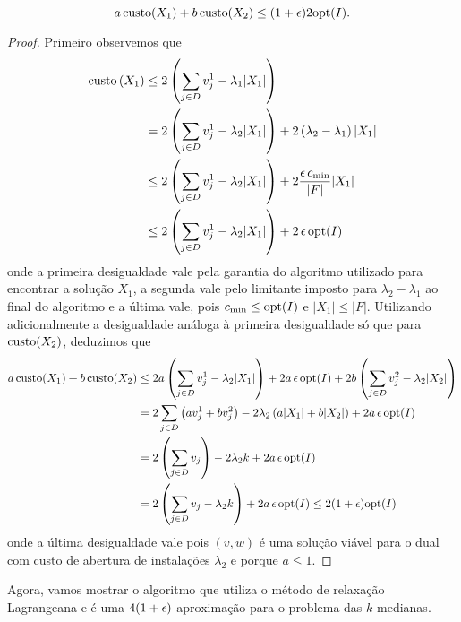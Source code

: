 \begin{lemma}
    \label{k-median_relLag_lema1}
    \[a \, \mathrm{custo}(X_1) + b \,\mathrm{custo}(X_2) \leq (1+\epsilon) 2\mathrm{opt}(I).\]
\end{lemma}
\begin{proof}
Primeiro observemos que 
\begin{subequations}
    \begin{align*}
        \mathrm{custo}\left(X_1\right) &\leq 2\left(\sum_{j \in D} v_j^1 - \lambda_1|X_1|\right) \\
        & = 2 \left(\sum_{j \in D} v_j^1 - \lambda_2 |X_1| \right) + 2 \left(\lambda_2 - \lambda_1\right) |X_1| \\
        &\leq 2 \left(\sum_{j \in D} v_j^1 - \lambda_2 |X_1| \right) + 2\frac{\epsilon\, c_{\min}}{|F|}|X_1|  \\
        &\leq 2 \left(\sum_{j \in D} v_j^1 - \lambda_2 |X_1| \right) + 2 \, \epsilon \, \mathrm{opt}(I)
    \end{align*}
\end{subequations}
onde a primeira desigualdade vale pela garantia do algoritmo utilizado para encontrar a solução $X_1$, a segunda vale pelo limitante imposto para $\lambda_2 - \lambda_1$ ao final do algoritmo e a última vale, pois $c_{\min} \leq \mathrm{opt}(I)$ e $|X_1| \leq |F|$. Utilizando adicionalmente a desigualdade análoga à primeira desigualdade só que para $\mathrm{custo}(X_2)$, deduzimos que
\begin{subequations}
    \begin{align*}
        a \, \mathrm{custo}(X_1) + b \,\mathrm{custo}(X_2) &\leq 2a \left(\sum_{j\in D} v_j^1 - \lambda_2|X_1|\right) + 2a\, \epsilon\,\mathrm{opt}(I) + 2b\left(\sum_{j\in D} v_j^2 - \lambda_2|X_2|\right) \\
        &= 2\sum_{j \in D} \left(a v_j^1 + b v_j^2\right) - 2\lambda_2\left( a|X_1| + b|X_2|\right) + 2a\,\epsilon\,\mathrm{opt}(I)\\
        & = 2\left(\sum_{j\in D } v_j\right) - 2\lambda_2 k + 2a\,\epsilon\,\mathrm{opt}(I)\\
        & = 2\left( \sum_{j \in D } v_j -\lambda_2 k\right) + 2a\,\epsilon\,\mathrm{opt}(I) \leq 2(1+\epsilon)\mathrm{opt}(I)
    \end{align*}
\end{subequations}
onde a última desigualdade vale pois $(v,w)$ é uma solução viável para o dual com custo de abertura de instalações $\lambda_2$ e porque $a \leq 1$.
\end{proof}

Agora, vamos mostrar o algoritmo que utiliza o método de relaxação Lagrangeana e é uma $4(1 + \epsilon)$-aproximação para o problema das $k$-medianas.

